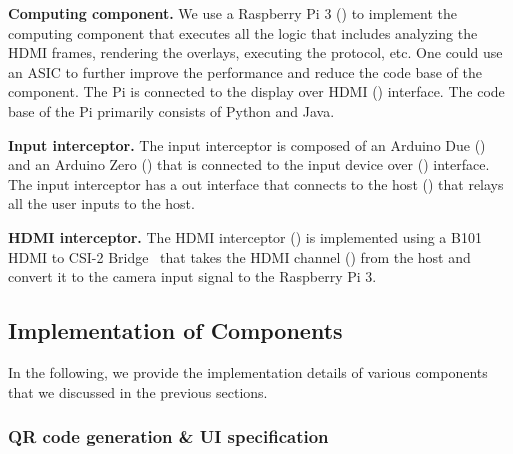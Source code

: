 \begin{mylist}
 
  \item \textbf{Computing component.} We use a Raspberry Pi 3 (\six) to implement the computing component that executes all the \device logic that includes analyzing the HDMI frames, rendering the overlays, executing the \tls protocol, etc. One could use an ASIC to further improve the performance and reduce the code base of the component. The Pi is connected to the display over HDMI (\nine) interface. The code base of the Pi primarily consists of Python and Java.
  
  \item \textbf{Input interceptor.} The input interceptor is composed of an Arduino Due (\three) and an Arduino Zero (\four) that is connected to the input device over \usb (\two) interface. The input interceptor has a \usb out interface that connects to the host (\five) that relays all the user inputs to the host. 

  \item \textbf{HDMI interceptor.} The HDMI interceptor (\seven) is implemented using a B101 HDMI to CSI-2 Bridge~\cite{b101} that takes the HDMI channel (\eight) from the host and convert it to the camera input signal to the Raspberry Pi 3.  
 
\end{mylist}

\subsection{Implementation of \name Components}
\label{sec:prototype:impl}


In the following, we provide the implementation details of various \name components that we discussed in the previous sections.

\subsubsection{\bfseries QR code generation \& UI specification}
\label{sec:prototype:impl:qr}

